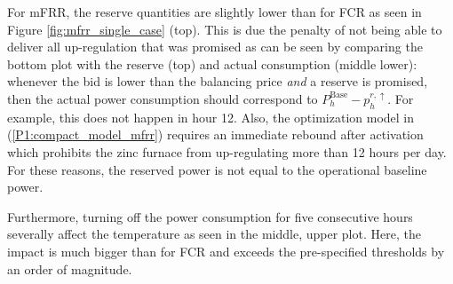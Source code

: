 \documentclass[sigconf]{acmart}
\begin{document}
For mFRR, the reserve quantities are slightly lower than for FCR as seen in Figure \ref{fig:mfrr_single_case} (top). This is due the penalty of not being able to deliver all up-regulation that was promised as can be seen by comparing the bottom plot with the reserve (top) and actual consumption (middle lower): whenever the bid is lower than the balancing price \textit{and} a reserve is promised, then the actual power consumption should correspond to $P^{\text{Base}}_{h} - p_{h}^{r, \uparrow}$. For example, this does not happen in hour 12. Also, the optimization model in (\ref{P1:compact_model_mfrr}) requires an immediate rebound after activation which prohibits the zinc furnace from up-regulating more than 12 hours per day. For these reasons, the reserved power is not equal to the operational baseline power.

Furthermore, turning off the power consumption for five consecutive hours severally affect the temperature as seen in the middle, upper plot. Here, the impact is much bigger than for FCR and exceeds the pre-specified thresholds by an order of magnitude.
\end{document}

